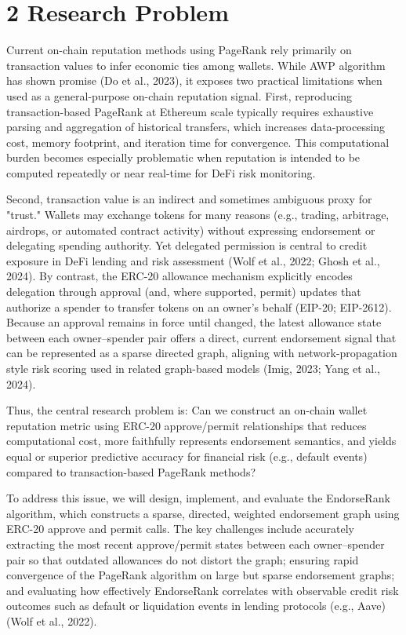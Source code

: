 \documentclass[12pt]{article}
\begin{document}
\section*{2 \textbf{Research Problem}}
\label{sec:research-problem}

Current on-chain reputation methods using PageRank rely primarily on transaction values to infer economic ties among wallets. While AWP algorithm has shown promise (Do et al., 2023), it exposes two practical limitations when used as a general-purpose on-chain reputation signal. First, reproducing transaction-based PageRank at Ethereum scale typically requires exhaustive parsing and aggregation of historical transfers, which increases data-processing cost, memory footprint, and iteration time for convergence. This computational burden becomes especially problematic when reputation is intended to be computed repeatedly or near real-time for DeFi risk monitoring.


Second, transaction value is an indirect and sometimes ambiguous proxy for "trust." Wallets may exchange tokens for many reasons (e.g., trading, arbitrage, airdrops, or automated contract activity) without expressing endorsement or delegating spending authority. Yet delegated permission is central to credit exposure in DeFi lending and risk assessment (Wolf et al., 2022; Ghosh et al., 2024). By contrast, the ERC-20 allowance mechanism explicitly encodes delegation through approval (and, where supported, permit) updates that authorize a spender to transfer tokens on an owner's behalf (EIP-20; EIP-2612). Because an approval remains in force until changed, the latest allowance state between each owner--spender pair offers a direct, current endorsement signal that can be represented as a sparse directed graph, aligning with network-propagation style risk scoring used in related graph-based models (Imig, 2023; Yang et al., 2024).


Thus, the central research problem is: Can we construct an on-chain wallet reputation metric using ERC-20 approve/permit relationships that reduces computational cost, more faithfully represents endorsement semantics, and yields equal or superior predictive accuracy for financial risk (e.g., default events) compared to transaction-based PageRank methods?


To address this issue, we will design, implement, and evaluate the EndorseRank algorithm, which constructs a sparse, directed, weighted endorsement graph using ERC-20 approve and permit calls. The key challenges include accurately extracting the most recent approve/permit states between each owner--spender pair so that outdated allowances do not distort the graph; ensuring rapid convergence of the PageRank algorithm on large but sparse endorsement graphs; and evaluating how effectively EndorseRank correlates with observable credit risk outcomes such as default or liquidation events in lending protocols (e.g., Aave) (Wolf et al., 2022).
\end{document}
